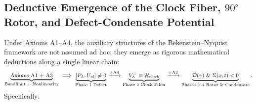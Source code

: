\documentclass[11pt,a4paper]{article}
\theoremstyle{definition}
\begin{document}
\subsection{Deductive Emergence of the Clock Fiber, $90^\circ$ Rotor, and Defect-Condensate Potential}
\label{subsec:deductive-chain}
Under Axioms A1--A4, the auxiliary structures of the Bekenstein--Nyquist framework are not assumed ad hoc; they emerge as rigorous mathematical deductions along a single linear chain:
\begin{equation}
\small
\underbrace{\text{Axioms A1 + A3}}_{\text{Bandlimit + Nonlinearity}} \implies \underbrace{[P_{\Lambda}, U_{\text{nl}}] \ne 0}_{\text{Phase 1 Defect}} \xrightarrow{+\text{A4}} \underbrace{V_{\Lambda}^{\perp} \equiv \mathcal{H}_{\text{clock}}}_{\text{Phase 5 Clock Fiber}} \xrightarrow{+\text{A2}} \underbrace{\mathcal{D}(\gamma) \text{ \& } \Sigma(x,t) < 0}_{\text{Phases 2--4 Rotor \& Condensate}}.
\end{equation}
Specifically:
\end{document}

